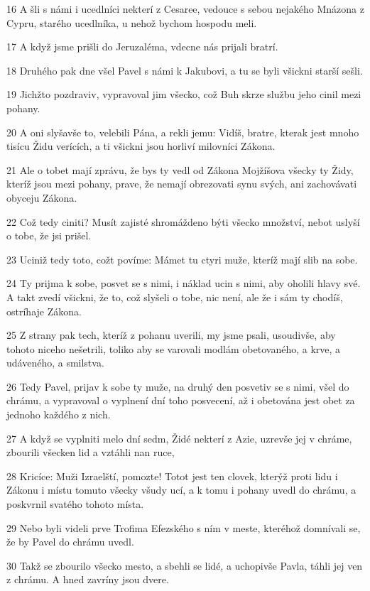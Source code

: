 \par 16 A šli s námi i ucedlníci nekterí z Cesaree, vedouce s sebou nejakého Mnázona z Cypru, starého ucedlníka, u nehož bychom hospodu meli.
\par 17 A když jsme prišli do Jeruzaléma, vdecne nás prijali bratrí.
\par 18 Druhého pak dne všel Pavel s námi k Jakubovi, a tu se byli všickni starší sešli.
\par 19 Jichžto pozdraviv, vypravoval jim všecko, což Buh skrze službu jeho cinil mezi pohany.
\par 20 A oni slyšavše to, velebili Pána, a rekli jemu: Vidíš, bratre, kterak jest mnoho tisícu Židu verících, a ti všickni jsou horliví milovníci Zákona.
\par 21 Ale o tobet mají zprávu, že bys ty vedl od Zákona Mojžíšova všecky ty Židy, kteríž jsou mezi pohany, prave, že nemají obrezovati synu svých, ani zachovávati obyceju Zákona.
\par 22 Což tedy ciniti? Musít zajisté shromáždeno býti všecko množství, nebot uslyší o tobe, že jsi prišel.
\par 23 Uciniž tedy toto, cožt povíme: Mámet tu ctyri muže, kteríž mají slib na sobe.
\par 24 Ty prijma k sobe, posvet se s nimi, i náklad ucin s nimi, aby oholili hlavy své. A takt zvedí všickni, že to, což slyšeli o tobe, nic není, ale že i sám ty chodíš, ostríhaje Zákona.
\par 25 Z strany pak tech, kteríž z pohanu uverili, my jsme psali, usoudivše, aby tohoto niceho nešetrili, toliko aby se varovali modlám obetovaného, a krve, a udáveného, a smilstva.
\par 26 Tedy Pavel, prijav k sobe ty muže, na druhý den posvetiv se s nimi, všel do chrámu, a vypravoval o vyplnení dní toho posvecení, až i obetována jest obet za jednoho každého z nich.
\par 27 A když se vyplniti melo dní sedm, Židé nekterí z Azie, uzrevše jej v chráme, zbourili všecken lid a vztáhli nan ruce,
\par 28 Kricíce: Muži Izraelští, pomozte! Totot jest ten clovek, kterýž proti lidu i Zákonu i místu tomuto všecky všudy ucí, a k tomu i pohany uvedl do chrámu, a poskvrnil svatého tohoto místa.
\par 29 Nebo byli videli prve Trofima Efezského s ním v meste, kteréhož domnívali se, že by Pavel do chrámu uvedl.
\par 30 Takž se zbourilo všecko mesto, a sbehli se lidé, a uchopivše Pavla, táhli jej ven z chrámu. A hned zavríny jsou dvere.
